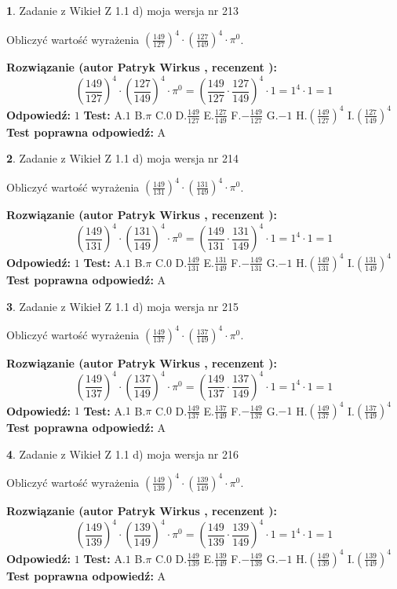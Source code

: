 \documentclass[12pt, a4paper]{article}
\theoremstyle{definition} %
\newtheorem{zad}{}
\newcommand{\zadStart}[1]{\begin{zad}#1\newline}
\newcommand{\zadStop}{\end{zad}}
\newcommand{\rozwStart}[2]{\noindent \textbf{Rozwiązanie (autor #1 , recenzent #2): }\newline}
\newcommand{\rozwStop}{\newline}
\newcommand{\odpStart}{\noindent \textbf{Odpowiedź:}\newline}
\newcommand{\odpStop}{\newline}
\newcommand{\testStart}{\noindent \textbf{Test:}\newline}
\newcommand{\testStop}{\newline}
\newcommand{\kluczStart}{\noindent \textbf{Test poprawna odpowiedź:}\newline}
\newcommand{\kluczStop}{\newline}
\begin{document}
\zadStart{Zadanie z Wikieł Z 1.1 d) moja wersja nr 213}

Obliczyć wartość wyrażenia $(\frac{149}{127})^{4} \cdot (\frac{127}{149})^{4} \cdot \pi^{0}$.
\zadStop
\rozwStart{Patryk Wirkus}{}
$$(\frac{149}{127})^{4} \cdot (\frac{127}{149})^{4} \cdot \pi^{0} = (\frac{149}{127} \cdot \frac{127}{149})^{4} \cdot 1 = 1^{4} \cdot 1 = 1$$
\rozwStop
\odpStart
$1$
\odpStop
\testStart
A.$1$ B.$\pi$ C.$0$ D.$\frac{149}{127}$ E.$\frac{127}{149}$
F.$-\frac{149}{127}$ G.$-1$
H.$(\frac{149}{127})^{4}$
I.$(\frac{127}{149})^{4}$
\testStop
\kluczStart
A
\kluczStop



\zadStart{Zadanie z Wikieł Z 1.1 d) moja wersja nr 214}

Obliczyć wartość wyrażenia $(\frac{149}{131})^{4} \cdot (\frac{131}{149})^{4} \cdot \pi^{0}$.
\zadStop
\rozwStart{Patryk Wirkus}{}
$$(\frac{149}{131})^{4} \cdot (\frac{131}{149})^{4} \cdot \pi^{0} = (\frac{149}{131} \cdot \frac{131}{149})^{4} \cdot 1 = 1^{4} \cdot 1 = 1$$
\rozwStop
\odpStart
$1$
\odpStop
\testStart
A.$1$ B.$\pi$ C.$0$ D.$\frac{149}{131}$ E.$\frac{131}{149}$
F.$-\frac{149}{131}$ G.$-1$
H.$(\frac{149}{131})^{4}$
I.$(\frac{131}{149})^{4}$
\testStop
\kluczStart
A
\kluczStop



\zadStart{Zadanie z Wikieł Z 1.1 d) moja wersja nr 215}

Obliczyć wartość wyrażenia $(\frac{149}{137})^{4} \cdot (\frac{137}{149})^{4} \cdot \pi^{0}$.
\zadStop
\rozwStart{Patryk Wirkus}{}
$$(\frac{149}{137})^{4} \cdot (\frac{137}{149})^{4} \cdot \pi^{0} = (\frac{149}{137} \cdot \frac{137}{149})^{4} \cdot 1 = 1^{4} \cdot 1 = 1$$
\rozwStop
\odpStart
$1$
\odpStop
\testStart
A.$1$ B.$\pi$ C.$0$ D.$\frac{149}{137}$ E.$\frac{137}{149}$
F.$-\frac{149}{137}$ G.$-1$
H.$(\frac{149}{137})^{4}$
I.$(\frac{137}{149})^{4}$
\testStop
\kluczStart
A
\kluczStop



\zadStart{Zadanie z Wikieł Z 1.1 d) moja wersja nr 216}

Obliczyć wartość wyrażenia $(\frac{149}{139})^{4} \cdot (\frac{139}{149})^{4} \cdot \pi^{0}$.
\zadStop
\rozwStart{Patryk Wirkus}{}
$$(\frac{149}{139})^{4} \cdot (\frac{139}{149})^{4} \cdot \pi^{0} = (\frac{149}{139} \cdot \frac{139}{149})^{4} \cdot 1 = 1^{4} \cdot 1 = 1$$
\rozwStop
\odpStart
$1$
\odpStop
\testStart
A.$1$ B.$\pi$ C.$0$ D.$\frac{149}{139}$ E.$\frac{139}{149}$
F.$-\frac{149}{139}$ G.$-1$
H.$(\frac{149}{139})^{4}$
I.$(\frac{139}{149})^{4}$
\testStop
\kluczStart
A
\kluczStop
\end{document}
